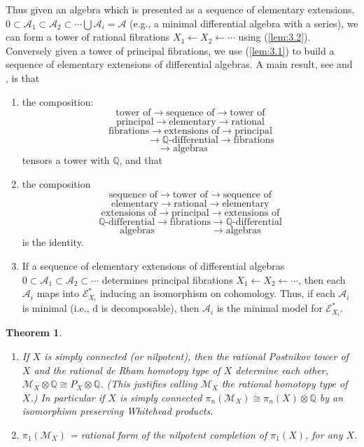 \documentclass[11pt]{amsart}
\theoremstyle{plain}
\newtheorem{theorem}{Theorem}[section]
\theoremstyle{definition}
\newcommand{\sA}{\mathscr{A}}
\newcommand{\sE}{\mathscr{E}}
\newcommand{\cM}{\mathcal{M}}
\newcommand{\dd}{\mathrm{d}}
\newcommand{\QQ}{\mathbb{Q}}
\begin{document}
Thus given an algebra which is presented as a sequence of elementary extensions, $0 \subset \sA_{1} \subset \sA_{2} \subset \cdots \bigcup \sA_{i} = \sA$ (e.g., a minimal differential algebra with a series), we can form a tower of rational fibrations $X_{1} \leftarrow X_{2} \leftarrow \cdots$ using (\ref{lem:3.2}). Conversely given a tower of principal fibrations, we use (\ref{lem:3.1}) to build a sequence of elementary extensions of differential algebras. A main result, see \cite{S1} and \cite{S2}, is that
\begin{enumerate}
\item[1)] the composition:
\[
\text{tower of} \to \text{sequence of} \to \text{tower of}
\]
\[
\text{principal} \to \text{elementary} \to \text{rational}
\]
\[
\text{fibrations} \to \text{extensions of} \to \text{principal}
\]
\[
\phantom{\text{fibrations}} \to \text{$\QQ$-differential} \to \text{fibrations}
\]
\[
\phantom{\text{fibrations}} \to \text{algebras} \phantom{\to \text{fibrations}}
\]
tensors a tower with $\QQ$, and that
\item[2)] the composition
\[
\text{sequence of} \to \text{tower of} \to \text{sequence of}
\]
\[
\text{elementary} \to \text{rational} \to \text{elementary}
\]
\[
\text{extensions of} \to \text{principal} \to \text{extensions of}
\]
\[
\text{$\QQ$-differential} \to \text{fibrations} \to \text{$\QQ$-differential}
\]
\[
\text{algebras} \phantom{\to \text{fibrations}} \to \text{algebras}
\]
is the identity.
\item[3)] If a sequence of elementary extensions of differential algebras $0 \subset \sA_{1} \subset \sA_{2} \subset \cdots$ determines principal fibrations $X_{1} \leftarrow X_{2} \leftarrow \cdots$, then each $\sA_{i}$ maps into $\sE^{*}_{X_{i}}$ inducing an isomorphism on cohomology. Thus, if each $\sA_{i}$ is minimal (i.e., $\dd$ is decomposable), then $\sA_{i}$ is the minimal model for $\sE^{*}_{X_{i}}$.
\end{enumerate}

\begin{theorem}\label{thm:3.3}
\begin{enumerate}
\item[(a)] If $X$ is simply connected (or nilpotent), then the rational Postnikov tower of $X$ and the rational de Rham homotopy type of $X$ determine each other, $\cM_{X} \otimes \QQ \cong P_{X} \otimes \QQ$. (This justifies calling $\cM_{X}$ the rational homotopy type of $X$.) In particular if $X$ is simply connected $\pi_{n}(\cM_{X}) \cong \pi_{n}(X) \otimes \QQ$ by an isomorphism preserving Whitehead products.
\item[(b)] $\pi_{1}(\cM_{X})$ = rational form of the nilpotent completion of $\pi_{1}(X)$, for any $X$.
\end{enumerate}
\end{theorem}
\end{document}
